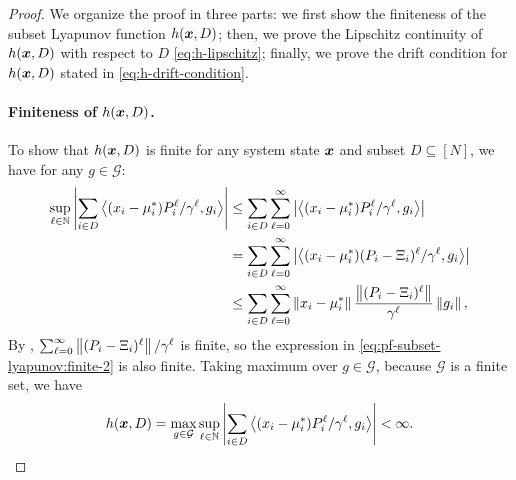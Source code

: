 \begin{proof}
We organize the proof in three parts: we first show the finiteness of the subset Lyapunov function $h(\bm{x}, D)$; then, we prove the Lipschitz continuity of $h(\bm{x}, D)$ with respect to $D$ \eqref{eq:h-lipschitz}; finally, we prove the drift condition for $h(\bm{x}, D)$ stated in \eqref{eq:h-drift-condition}. 

\paragraph{Finiteness of $h(\bm{x}, D)$.}
To show that $h(\bm{x},D)$ is finite for any system state $\bm{x}$ and subset $D\subseteq [N]$, we have for any $g\in \mathcal{G}$: 
\begin{align}
    \nonumber
    \sup_{\ell\in\mathbb{N}} \left\lvert\sum_{i\in D} \left\langle (x_i-\mu_i^*) P_i^{\ell} / \gamma^{\ell}, g_i \right\rangle\right\rvert
    &\leq \sum_{i\in D} \sum_{\ell=0}^\infty \left\lvert\left\langle (x_i-\mu_i^*) P_i^{\ell} / \gamma^{\ell}, g_i \right\rangle\right\rvert\\
    \label{eq:pf-subset-lyapunov:finite-1}
    &= \sum_{i\in D}\sum_{\ell=0}^\infty \left\lvert\left\langle (x_i-\mu_i^*) (P_i-\Xi_i)^{\ell} / \gamma^{\ell}, g_i \right\rangle\right\rvert \\
    \label{eq:pf-subset-lyapunov:finite-2}
    &\leq \sum_{i\in D} \sum_{\ell=0}^\infty \left\lVert x_i-\mu_i^*\right\rVert\frac{\left\lVert(P_i-\Xi_i)^{\ell}\right\rVert}{\gamma^{\ell}}\left\lVert g_i\right\rVert,
\end{align}
By , $\sum_{\ell=0}^\infty \left\lVert(P_i-\Xi_i)^{\ell}\right\rVert / \gamma^{\ell}$ is finite, so the expression in \eqref{eq:pf-subset-lyapunov:finite-2} is also finite. Taking maximum over $g\in \mathcal{G}$, because $\mathcal{G}$ is a finite set, we have 
\[
    h(\bm{x}, D) = \max_{g\in \mathcal{G}} \sup_{\ell\in\mathbb{N}} \left\lvert\sum_{i\in D} \left\langle (x_i-\mu_i^*) P_i^{\ell} / \gamma^{\ell}, g_i \right\rangle\right\rvert < \infty.
\]


\end{proof}

